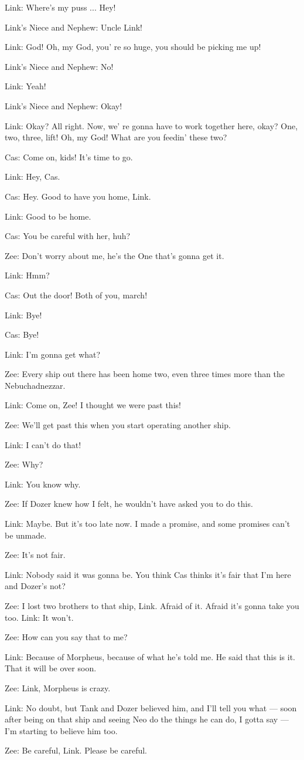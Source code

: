 \documentclass{ctexart}
\newenvironment{myquote}{\color{green} \setlength{\leftskip}{6em} \setlength{\rightskip}{4em} \setlength{\parindent}{-2em}}{\par}
\begin{document}
\begin{myquote}
Link: Where's my puss ... Hey!

Link's Niece and Nephew: Uncle Link!

Link: God! Oh, my God, you' re so huge, you should be picking me up!

Link's Niece and Nephew: No!

Link: Yeah!

Link's Niece and Nephew: Okay!

Link: Okay? All right. Now, we' re gonna have to work together here, okay? One, two, three, lift! Oh, my God! What are you feedin' these two?

Cas: Come on, kids! It's time to go.

Link: Hey, Cas.

Cas: Hey. Good to have you home, Link.

Link: Good to be home.

Cas: You be careful with her, huh?

Zee: Don't worry about me, he's the One that's gonna get it.

Link: Hmm?

Cas: Out the door! Both of you, march!

Link: Bye!

Cas: Bye!

Link: I'm gonna get what?

Zee: Every ship out there has been home two, even three times more than the Nebuchadnezzar.

Link: Come on, Zee! I thought we were past this!

Zee: We'll get past this when you start operating another ship.

Link: I can't do that!

Zee: Why?

Link: You know why.

Zee: If Dozer knew how I felt, he wouldn't have asked you to do this.

Link: Maybe. But it's too late now. I made a promise, and some promises can't be unmade.

Zee: It's not fair.

Link: Nobody said it was gonna be. You think Cas thinks it's fair that I'm here and Dozer's not?

Zee: I lost two brothers to that ship, Link. Afraid of it. Afraid it's gonna take you too. Link: It won't.

Zee: How can you say that to me?

Link: Because of Morpheus, because of what he's told me. He said that this is it. That it will be over soon.

Zee: Link, Morpheus is crazy.

Link: No doubt, but Tank and Dozer believed him, and I'll tell you what --- soon after being on that ship and seeing Neo do the things he can do, I gotta say --- I'm starting to believe him too.

Zee: Be careful, Link. Please be careful.
\end{myquote}
\end{document}

